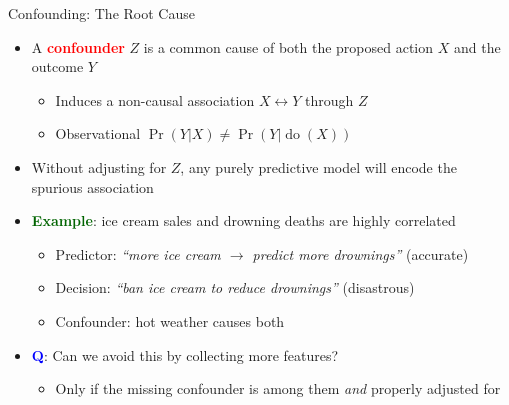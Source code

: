 \documentclass[
  10pt,
  ignorenonframetext,
]{beamer}
\providecommand{\tightlist}{%
  \setlength{\itemsep}{0pt}\setlength{\parskip}{0pt}}
\begin{document}
\begin{frame}{Confounding: The Root Cause}
\label{confounding-the-root-cause}
\begin{itemize}
\item
  A \textbf{\textcolor{red}{confounder}} \(Z\) is a common cause of both
  the proposed action \(X\) and the outcome \(Y\)

  \begin{itemize}
  \tightlist
  \item
    Induces a non-causal association \(X \leftrightarrow Y\) through
    \(Z\)
  \item
    Observational \(\Pr(Y | X) \neq \Pr(Y | \operatorname{do}(X))\)
  \end{itemize}
\item
  Without adjusting for \(Z\), any purely predictive model will encode
  the spurious association
\item
  \textbf{\textcolor{darkgreen}{Example}}: ice cream sales and drowning
  deaths are highly correlated

  \begin{itemize}
  \tightlist
  \item
    Predictor: \emph{``more ice cream \(\to\) predict more drownings''}
    (accurate)
  \item
    Decision: \emph{``ban ice cream to reduce drownings''} (disastrous)
  \item
    Confounder: hot weather causes both
  \end{itemize}
\item
  \textbf{\textcolor{blue}{Q}}: Can we avoid this by collecting more
  features?

  \begin{itemize}
  \tightlist
  \item
    Only if the missing confounder is among them \emph{and} properly
    adjusted for
  \end{itemize}
\end{itemize}
\end{frame}
\end{document}
